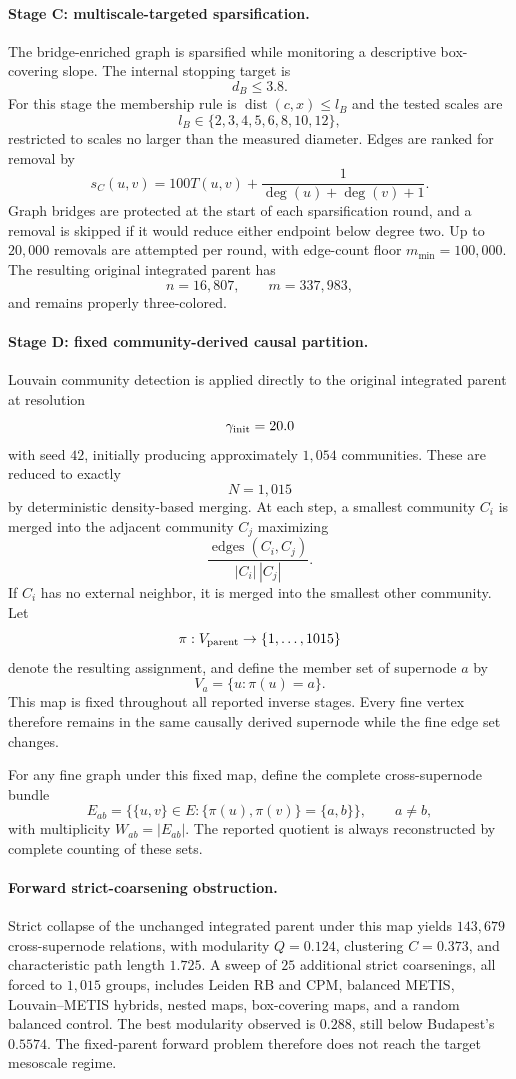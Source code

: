 \documentclass[12pt]{article}
\begin{document}
\paragraph{Stage C: multiscale-targeted sparsification.}
The bridge-enriched graph is sparsified while monitoring a descriptive
box-covering slope.  The internal stopping target is
\[
d_B\leq3.8.
\]
For this stage the membership rule is \(\operatorname{dist}(c,x)\leq l_B\)
and the tested scales are
\[
l_B\in\{2,3,4,5,6,8,10,12\},
\]
restricted to scales no larger than the measured diameter.  Edges are ranked
for removal by
\[
s_C(u,v)=100T(u,v)+\frac{1}{\deg(u)+\deg(v)+1}.
\]
Graph bridges are protected at the start of each sparsification round, and a
removal is skipped if it would reduce either endpoint below degree two.  Up
to \(20{,}000\) removals are attempted per round, with edge-count floor
\(m_{\min}=100{,}000\).  The resulting original integrated parent has
\[
n=16{,}807,\qquad m=337{,}983,
\]
and remains properly three-colored.

\paragraph{Stage D: fixed community-derived causal partition.}
Louvain community detection is applied directly to the original integrated
parent at resolution
\[
\gamma_{\rm init}=20.0
\]
with seed \(42\), initially producing approximately \(1{,}054\) communities.
These are reduced to exactly
\[
N=1{,}015
\]
by deterministic density-based merging.  At each step, a smallest community
\(C_i\) is merged into the adjacent community \(C_j\) maximizing
\[
\frac{\operatorname{edges}(C_i,C_j)}{|C_i|\,|C_j|}.
\]
If \(C_i\) has no external neighbor, it is merged into the smallest other
community.  Let
\[
\pi:V_{\rm parent}\to\{1,\ldots,1015\}
\]
denote the resulting assignment, and define the member set of supernode \(a\)
by
\[
V_a=\{u:\pi(u)=a\}.
\]
This map is fixed throughout all reported inverse stages.  Every fine vertex
therefore remains in the same causally derived supernode while the fine edge
set changes.

For any fine graph under this fixed map, define the complete cross-supernode
bundle
\[
E_{ab}=\{\{u,v\}\in E:\{\pi(u),\pi(v)\}=\{a,b\}\},\qquad a\neq b,
\]
with multiplicity \(W_{ab}=|E_{ab}|\).  The reported quotient is always
reconstructed by complete counting of these sets.

\paragraph{Forward strict-coarsening obstruction.}
Strict collapse of the unchanged integrated parent under this map yields
\(143{,}679\) cross-supernode relations, with modularity \(Q=0.124\),
clustering \(C=0.373\), and characteristic path length \(1.725\).  A sweep of
\(25\) additional strict coarsenings, all forced to \(1{,}015\) groups,
includes Leiden RB and CPM, balanced METIS, Louvain--METIS hybrids, nested
maps, box-covering maps, and a random balanced control.  The best modularity
observed is \(0.288\), still below Budapest's \(0.5574\).  The fixed-parent
forward problem therefore does not reach the target mesoscale regime.
\end{document}

